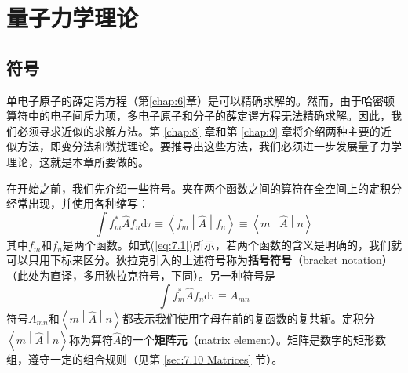 \chapter{量子力学理论}
\label{chap:7}
\section{符号}
\label{sec:7.1 Notation}
    单电子原子的薛定谔方程（第\ref{chap:6}章）是可以精确求解的。然而，由于哈密顿算符中的电子间斥力项，多电子原子和分子的薛定谔方程无法精确求解。因此，我们必须寻求近似的求解方法。第 \ref{chap:8} 章和第 \ref{chap:9} 章将介绍两种主要的近似方法，即变分法和微扰理论。要推导出这些方法，我们必须进一步发展量子力学理论，这就是本章所要做的。

    在开始之前，我们先介绍一些符号。夹在两个函数之间的算符在全空间上的定积分经常出现，并使用各种缩写：
    \begin{equation}
        \int f^{\ast}_m\hat{A}f_n\mathrm{d}\tau \equiv \left\langle f_m \middle| \hat{A} \middle| f_n \right\rangle \equiv \left\langle m \middle| \hat{A} \middle| n \right\rangle
        \label{eq:7.1}
    \end{equation}
    其中$f_m$和$f_n$是两个函数。如式(\ref{eq:7.1})所示，若两个函数的含义是明确的，我们就可以只用下标来区分。狄拉克引入的上述符号称为\textbf{括号符号}（bracket notation）（此处为直译，多用狄拉克符号，下同）。另一种符号是
    \begin{equation}
        \int f^{\ast}_m\hat{A}f_n\mathrm{d}\tau \equiv A_{mn}
        \label{eq:7.2}
    \end{equation}
    符号$A_{mn}$和$\left\langle m \middle| \hat{A} \middle| n \right\rangle$都表示我们使用字母在前的复函数的复共轭。定积分$\left\langle m \middle| \hat{A} \middle| n \right\rangle$称为算符$\hat{A}$的一个\textbf{矩阵元}（matrix element）。矩阵是数字的矩形数组，遵守一定的组合规则（见第 \ref{sec:7.10 Matrices} 节）。


